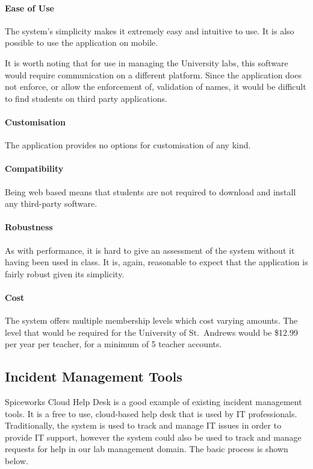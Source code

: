 \documentclass[a4paper,11pt]{article}
\begin{document}
\paragraph{Ease of Use}
The system's simplicity makes it extremely easy and intuitive to use. It is also possible to use the application on mobile. 

It is worth noting that for use in managing the University labs, this software would require communication on a different platform. Since the application does not enforce, or allow the enforcement of, validation of names, it would be difficult to find students on third party applications.


\paragraph{Customisation} 
The application provides no options for customisation of any kind.


\paragraph{Compatibility}  
Being web based means that students are not required to download and install any third-party software. 


\paragraph{Robustness}
As with performance, it is hard to give an assessment of the system without it having been used in class. It is, again, reasonable to expect that the application is fairly robust given its simplicity.


\paragraph{Cost}  
The system offers multiple membership levels which cost varying amounts. The level that would be required for the University of St.\ Andrews would be \$12.99 per year per teacher, for a minimum of 5 teacher accounts.


\newpage
\subsection{Incident Management Tools}

Spiceworks Cloud Help Desk is a good example of existing incident management tools. It is a free to use, cloud-based help desk that is used by IT professionals. Traditionally, the system is used to track and manage IT issues in order to provide IT support, however the system could also be used to track and manage requests for help in our lab management domain. The basic process is shown below.
\end{document}
